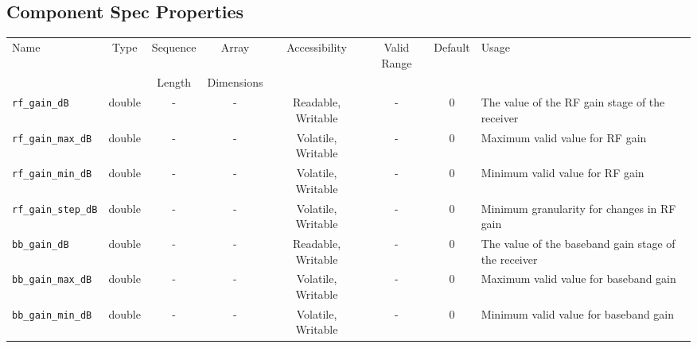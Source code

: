 \documentclass{article}
\begin{document}
\begin{landscape}
	\section*{Component Spec Properties}
	\begin{scriptsize}
		\begin{tabular}{|p{4cm}|c|c|c|c|c|c|p{8cm}|}
			\hline
			\rowcolor{blue}
			Name                                & Type   & Sequence & Array      & Accessibility       & Valid Range & Default & Usage                                                                                      \\
			\rowcolor{blue}
			                                    &        & Length   & Dimensions &                     &             &         &                                                                                            \\
			\hline
			\verb+rf_gain_dB+                   & double & -        & -          & Readable, Writable  & -           & 0       & The value of the RF gain stage of the receiver                                             \\
			\hline
			\verb+rf_gain_max_dB+               & double & -        & -          & Volatile, Writable & -           & 0       & Maximum valid value for RF gain                                                            \\
			\hline
			\verb+rf_gain_min_dB+               & double & -        & -          & Volatile, Writable & -           & 0       & Minimum valid value for RF gain                                                            \\
			\hline
			\verb+rf_gain_step_dB+              & double & -        & -          & Volatile, Writable & -           & 0       & Minimum granularity for changes in RF gain                                                 \\
			\hline
			\verb+bb_gain_dB+                   & double & -        & -          & Readable, Writable  & -           & 0       & The value of the baseband gain stage of the receiver                                       \\
			\hline
			\verb+bb_gain_max_dB+               & double & -        & -          & Volatile, Writable & -           & 0       & Maximum valid value for baseband gain                                                      \\
			\hline
			\verb+bb_gain_min_dB+               & double & -        & -          & Volatile, Writable & -           & 0       & Minimum valid value for baseband gain                                                      \\

\end{tabular}
\end{scriptsize}
\end{landscape}
\end{document}
